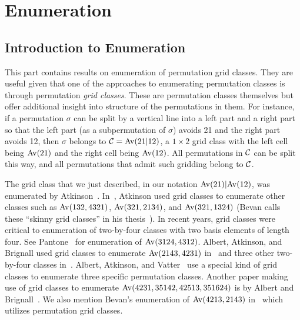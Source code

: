 \documentclass[12pt, a4paper, twoside]{report}
\begin{document}
\part{Enumeration} %
\label{part:enumeration}
%

\chapter{Introduction to Enumeration}
\label{chap:enumintro}
This part contains results on enumeration of permutation grid classes. They are useful given that one of the approaches to enumerating permutation classes is through permutation \emph{grid classes}. These are permutation classes themselves but offer additional insight into structure of the permutations in them. For instance, if a permutation $\sigma$ can be split by a vertical line into a left part and a right part so that the left part (as a subpermutation of $\sigma$) avoids 21 and the right part avoids 12, then $\sigma$ belongs to $\mathcal{C} = \mathrm{Av}(21|12)$, a $1\times 2$ grid class with the left cell being $\mathrm{Av}(21)$ and the right cell being $\mathrm{Av}(12)$. All permutations in $\mathcal{C}$ can be split this way, and all permutations that admit such gridding belong to $\mathcal{C}$.

The grid class that we just described, in our notation $\mathrm{Av}(21)|\mathrm{Av}(12)$, was enumerated by Atkinson~\cite{atkinson1998incrdecr}. In~\cite{atkinson1997restricted}, Atkinson used grid classes to enumerate other classes such as $\mathrm{Av}(132,4321)$, $\mathrm{Av}(321,2134)$, and $\mathrm{Av}(321,1324)$ (Bevan calls these ``skinny grid classes'' in his thesis~\cite{bevan2015thesis}). In recent years, grid classes were critical to enumeration of two-by-four classes with two basis elements of length four. See Pantone~\cite{pantone2by4} for enumeration of $\mathrm{Av}(3124,4312)$. Albert, Atkinson, and Brignall used grid classes to enumerate $\mathrm{Av}(2143,4231)$ in~\cite{albert2011enumeration} and three other two-by-four classes in~\cite{albert2012gridclasses}. Albert, Atkinson, and Vatter~\cite{albert2012inflations} use a special kind of grid classes to enumerate three specific permutation classes. Another paper making use of grid classes to enumerate $\mathrm{Av}(4231, 35142, 42513, 351624)$ is by Albert and Brignall~\cite{albert2014schubert}. We also mention Bevan's enumeration of $\mathrm{Av}(4213,2143)$ in~\cite{bevan-new} which utilizes permutation grid classes. 
\end{document}
